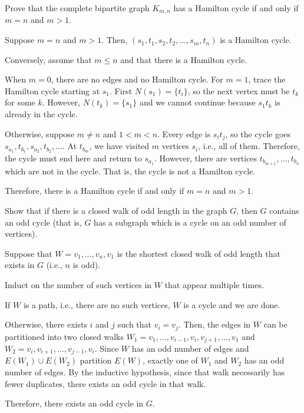 \begin{xca}
  Prove that the complete bipartite graph $K_{m,n}$ has a Hamilton cycle
  if and only if $m = n$ and $m > 1$.
\end{xca}
\begin{prf}
  Suppose $m = n$ and $m > 1$.
  Then, $(s_1,t_1,s_2,t_2,\dotsc,s_m,t_n)$ is a Hamilton cycle.

  Conversely, assume \Wlog that $m \leq n$ and that there is a Hamilton cycle.

  When $m = 0$, there are no edges and no Hamilton cycle.
  For $m = 1$, trace the Hamilton cycle starting at $s_1$.
  First $N(s_1) = \{t_i\}$, so the next vertex must be $t_k$ for some $k$.
  However, $N(t_k) = \{s_1\}$ and we cannot continue because $s_1t_k$ is already in the cycle.

  Otherwise, suppose $m \neq n$ and $1 < m < n$.
  Every edge is $s_i t_j$, so the cycle goes $s_{a_1},t_{b_1},s_{a_2},t_{b_2},\dotsc$.
  At $t_{b_m}$, we have visited $m$ vertices $s_i$, i.e., all of them.
  Therefore, the cycle must end here and return to $s_{a_1}$.
  However, there are vertices $t_{b_{m+1}},\dotsc,t_{b_n}$ which are not in the cycle.
  That is, the cycle is not a Hamilton cycle.

  Therefore, there is a Hamilton cycle if and only if $m = n$ and $m > 1$.
\end{prf}

\begin{xca}\label{xca:oddcycle}
  Show that if there is a closed walk of odd length in the graph $G$,
  then $G$ contains an odd cycle
  (that is, $G$ has a subgraph which is a cycle on an odd number of vertices).
\end{xca}
\begin{prf}
  Suppose that $W = v_1,\dotsc,v_n,v_1$
  is the shortest closed walk of odd length that exists in $G$ (i.e., $n$ is odd).

  Induct on the number of such vertices in $W$ that appear multiple times.

  If $W$ is a path, i.e., there are no such vertices, $W$ is a cycle and we are done.

  Otherwise, there exists $i$ and $j$ such that $v_i = v_j$.
  Then, the edges in $W$ can be partitioned into two closed walks
  $W_1 = v_1,\dotsc,v_{i-1},v_i,v_{j+1},\dotsc,v_1$ and $W_2 = v_i,v_{i+1},\dotsc,v_{j-1},v_i$.
  Since $W$ has an odd number of edges and $E(W_1) \cup E(W_2)$ partition $E(W)$,
  exactly one of $W_1$ and $W_2$ has an odd number of edges.
  By the inductive hypothesis, since that walk necessarily has fewer duplicates,
  there exists an odd cycle in that walk.

  Therefore, there exists an odd cycle in $G$.
\end{prf}

